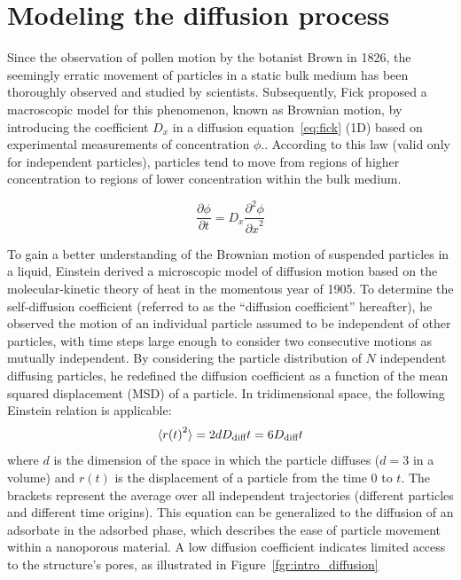 \documentclass[main]{subfiles}
\begin{document}
\section{Modeling the diffusion process}

Since the observation of pollen motion by the botanist Brown in 1826, the seemingly erratic movement of particles in a static bulk medium has been thoroughly observed and studied by scientists. Subsequently, Fick proposed a macroscopic model for this phenomenon, known as Brownian motion, by introducing the coefficient $D_x$ in a diffusion equation~\ref{eq:fick} (1D) based on experimental measurements of concentration $\phi$.\autocite{Fick_1855}. According to this law (valid only for independent particles), particles tend to move from regions of higher concentration to regions of lower concentration within the bulk medium.

\begin{equation}\label{eq:fick}
  \frac{\partial \phi}{\partial t} = D_x \frac{\partial^2 \phi}{{\partial x}^2}
\end{equation}

To gain a better understanding of the Brownian motion of suspended particles in a liquid, Einstein derived a microscopic model of diffusion motion based on the molecular-kinetic theory of heat in the momentous year of 1905.\autocite{einstein1905motion} To determine the self-diffusion coefficient (referred to as the ``diffusion coefficient'' hereafter), he observed the motion of an individual particle assumed to be independent of other particles, with time steps large enough to consider two consecutive motions as mutually independent. By considering the particle distribution of $N$ independent diffusing particles, he redefined the diffusion coefficient as a function of the mean squared displacement (MSD) of a particle. In tridimensional space, the following Einstein relation is applicable:
\begin{equation}\label{eq:einstein}
  \langle {r(t)}^2 \rangle = 2dD_{\text{diff}}t = 6D_{\text{diff}}t
\end{equation}
where  $d$ is the dimension of the space in which the particle diffuses ($d=3$ in a volume) and $r(t)$ is the displacement of a particle from the time $0$ to $t$. The brackets represent the average over all independent trajectories (different particles and different time origins). This equation can be generalized to the diffusion of an adsorbate in the adsorbed phase, which describes the ease of particle movement within a nanoporous material. A low diffusion coefficient indicates limited access to the structure's pores, as illustrated in Figure~\ref{fgr:intro_diffusion}
\end{document}
